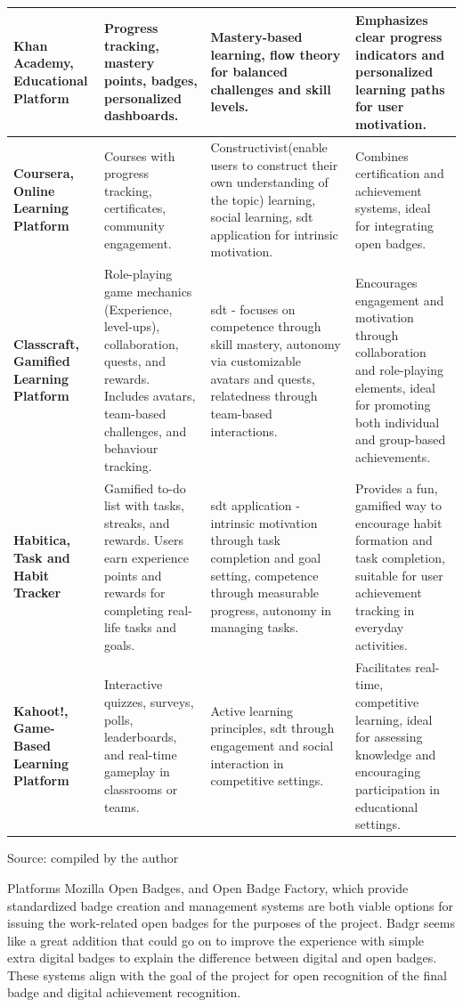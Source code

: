 \begin{longtable}[c]{|p{3cm}|p{4.2cm}|p{4.2cm}|p{4.2cm}|}
\hline
\textbf{Khan Academy, Educational Platform} & Progress tracking, mastery points, badges, personalized dashboards. & Mastery-based learning, flow theory for balanced challenges and skill levels. & Emphasizes clear progress indicators and personalized learning paths for user motivation. \\
\hline
\textbf{Coursera, Online Learning Platform} & Courses with progress tracking, certificates, community engagement. & Constructivist(enable users to construct their own understanding of the topic) learning, social learning, \acrshort{sdt} application for intrinsic motivation. & Combines certification and achievement systems, ideal for integrating open badges. \\
\hline
\textbf{Classcraft, Gamified Learning Platform} & Role-playing game mechanics (Experience, level-ups), collaboration, quests, and rewards. Includes avatars, team-based challenges, and behaviour tracking. & \acrshort{sdt} - focuses on competence through skill mastery, autonomy via customizable avatars and quests, relatedness through team-based interactions. & Encourages engagement and motivation through collaboration and role-playing elements, ideal for promoting both individual and group-based achievements. \\ \hline 
\textbf{Habitica, Task and Habit Tracker} & Gamified to-do list with tasks, streaks, and rewards. Users earn experience points and rewards for completing real-life tasks and goals. & \acrshort{sdt} application - intrinsic motivation through task completion and goal setting, competence through measurable progress, autonomy in managing tasks. & Provides a fun, gamified way to encourage habit formation and task completion, suitable for user achievement tracking in everyday activities. \\ \hline 
\textbf{Kahoot!, Game-Based Learning Platform} & Interactive quizzes, surveys, polls, leaderboards, and real-time gameplay in classrooms or teams. & Active learning principles, \acrshort{sdt} through engagement and social interaction in competitive settings. & Facilitates real-time, competitive learning, ideal for assessing knowledge and encouraging participation in educational settings. \\ \hline
\end{longtable}
{\raggedright \small{Source:} compiled by the author\par}

Platforms Mozilla Open Badges, and Open Badge Factory, which provide standardized badge creation and management systems are both viable options for issuing the work-related open badges for the purposes of the project. 
Badgr seems like a great addition that could go on to improve the experience with simple extra digital badges to explain the difference between digital and open badges. 
These systems align with the goal of the project for open recognition of the final badge and digital achievement recognition.

